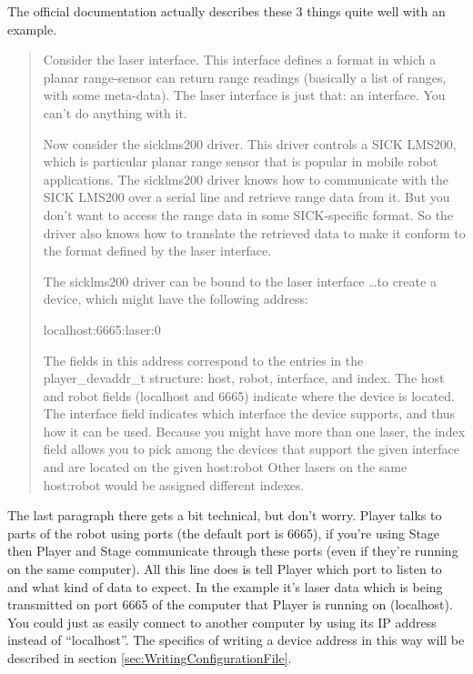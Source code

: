 \documentclass[a4paper]{article}
\newcommand{\pl}{Player\xspace}
\begin{document}
The official documentation actually describes these 3 things quite well with an example.

\begin{quotation}
	Consider the laser interface. This interface defines a format in which a planar range-sensor can return range readings (basically a list of ranges, with some meta-data). The laser interface is just that: an interface. You can't do anything with it.

	Now consider the sicklms200 driver. This driver controls a SICK LMS200, which is particular planar range sensor that is popular in mobile robot applications. The sicklms200 driver knows how to communicate with the SICK LMS200 over a serial line and retrieve range data from it. But you don't want to access the range data in some SICK-specific format. So the driver also knows how to translate the retrieved data to make it conform to the format defined by the laser interface.

	The sicklms200 driver can be bound to the laser interface \ldots to create a device, which might have the following address:

	localhost:6665:laser:0 \label{sec:setting_a_device}

	The fields in this address correspond to the entries in the \mbox{player\_devaddr\_t} structure: host, robot, interface, and index. The host and robot fields (localhost and 6665) indicate where the device is located. The interface field indicates which interface the device supports, and thus how it can be used. Because you might have more than one laser, the index field allows you to pick among the devices that support the given interface and are located on the given host:robot Other lasers on the same host:robot would be assigned different indexes.
\end{quotation}
The last paragraph there gets a bit technical, but don't worry. \pl talks to parts of the robot using ports (the default port is 6665), if you're using Stage then \pl and Stage communicate through these ports (even if they're running on the same computer). All this line does is tell \pl which port to listen to and what kind of data to expect. In the example it's laser data which is being transmitted on port 6665 of the computer that \pl is running on (localhost). You could just as easily connect to another computer by using its IP address instead of ``localhost''. The specifics of writing a device address in this way will be described in section \ref{sec:WritingConfigurationFile}.
\end{document}
